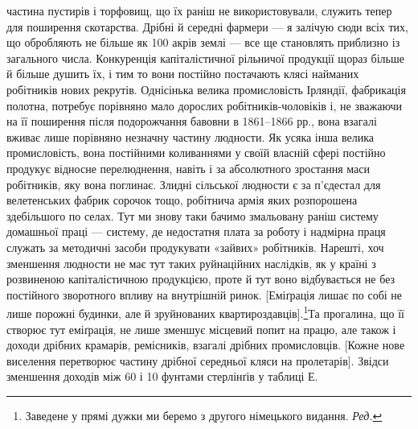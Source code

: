 \parcont{}  %
частина пустирів і торфовищ, що їх раніш не використовували,
служить тепер для поширення скотарства. Дрібні й середні
фармери — я залічую сюди всіх тих, що обробляють не більше
як 100 акрів землі — все ще становлять приблизно  із загального
числа.   Конкуренція капіталістичної рільничої продукції
щораз більше й більше душить їх, і тим то вони постійно постачають
клясі найманих робітників нових рекрутів. Однісінька
велика промисловість Ірляндії, фабрикація полотна, потребує
порівняно мало дорослих робітників-чоловіків і, не зважаючи
на її поширення після подорожчання бавовни в 1861--1866 рр.,
вона взагалі вживає лише порівняно незначну частину людности.
Як усяка інша велика промисловість, вона постійними коливаннями
у своїй власній сфері постійно продукує відносне перелюднення,
навіть і за абсолютного зростання маси робітників, яку
вона поглинає. Злидні сільської людности є за п’єдестал для велетенських
фабрик сорочок тощо, робітнича армія яких розпорошена
здебільшого по селах. Тут ми знову таки бачимо змальовану
раніш систему домашньої праці — систему, де недостатня
плата за роботу і надмірна праця служать за методичні засоби
продукувати «зайвих» робітників. Нарешті, хоч зменшення людности
не має тут таких руйнаційних наслідків, як у країні з розвиненою
капіталістичною продукцією, проте й тут воно відбувається
не без постійного зворотного впливу на внутрішній ринок.
[Еміґрація лишає по собі не лише порожні будинки, але й зруйнованих
квартироздавців].\footnote*{Заведене у прямі дужки ми беремо з другого німецького видання. \emph{Ред.}}Та прогалина, що її створює тут
еміґрація, не лише зменшує місцевий попит на працю, але також
і доходи дрібних крамарів, ремісників, взагалі дрібних промисловців.
[Кожне нове виселення перетворює частину дрібної середньої
кляси на пролетарів]. Звідси зменшення доходів між
60 і 10 фунтами стерлінґів у таблиці Е.

